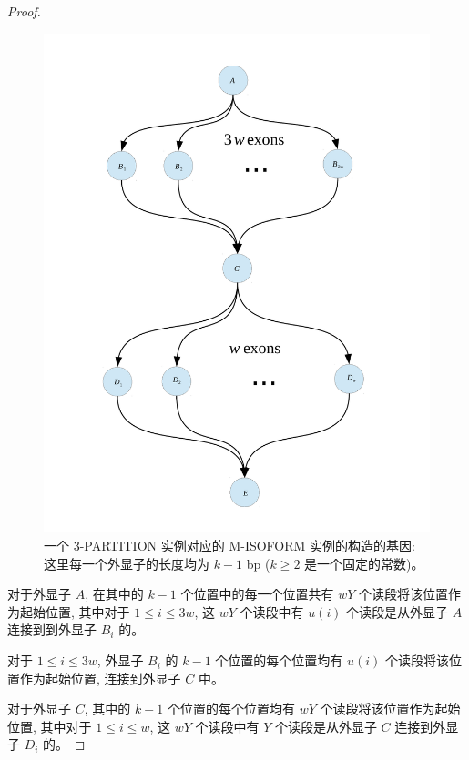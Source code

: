\begin{proof}
\begin{figure}[!t]
\centering
\includegraphics[width=1.0\textwidth]{figures/nphard/part3-gene.pdf}
\caption[一个 3-PARTITION 实例对应的 M-ISOFORM 实例的构造的基因]
{一个 3-PARTITION 实例对应的 M-ISOFORM 实例的构造的基因: 
这里每一个外显子的长度均为 $k-1$ bp ($k\geq 2$ 是一个固定的常数)。}
\label{tripart-reduce-gene}
\end{figure}

对于外显子 $A$, 在其中的 $k-1$ 个位置中的每一个位置共有 $wY$ 个读段将该位置作为起始位置, 
其中对于 $1\leq i\leq 3w$, 
这 $wY$ 个读段中有 $u(i)$ 个读段是从外显子 $A$ 连接到到外显子 $B_i$ 的。 

对于 $1\leq i\leq 3w$, 
外显子 $B_i$ 的 $k-1$ 个位置的每个位置均有 $u(i)$ 个读段将该位置作为起始位置, 
连接到外显子 $C$ 中。 

对于外显子 $C$, 其中的 $k-1$ 个位置的每个位置均有 $wY$ 个读段将该位置作为起始位置, 
其中对于 $1\leq i \leq w$,
这 $wY$ 个读段中有 $Y$ 个读段是从外显子 $C$ 连接到外显子 $D_i$ 的。 


\end{proof}
